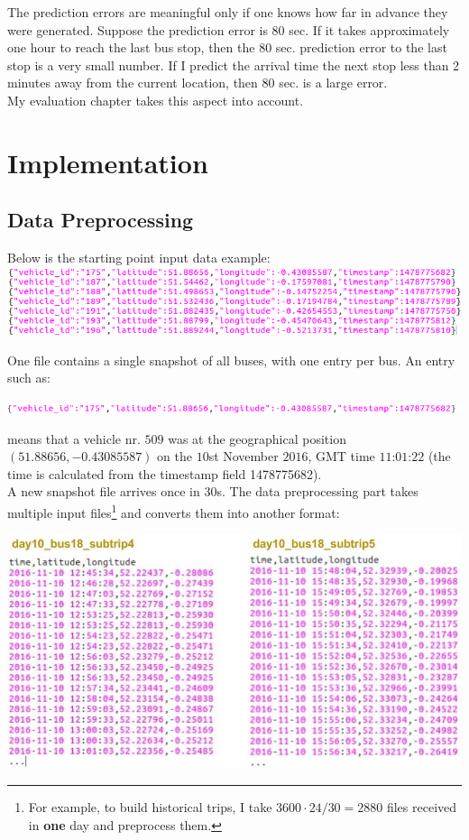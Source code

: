 \documentclass[12pt,a4paper,oneside,openright]{report}
\begin{document}
The prediction errors are meaningful only if one knows how far in advance they were
generated. Suppose the prediction error is 80 sec. If it takes approximately one hour to reach
the last bus stop, then the 80 sec. prediction error to the last stop is a very small number.
If I predict the arrival time the next stop less than 2 minutes away from the current location,
then 80 sec. is a large error. \\

My evaluation chapter takes this aspect into account.




\chapter{Implementation}

\section{Data Preprocessing}

Below is the starting point input data example: \\
\includegraphics[scale=0.6]{figs/starting_data.png}

One file contains a single snapshot of all buses, 
with one entry per bus. An entry such as:

\includegraphics[width=\textwidth]{figs/entry.png}

means that a vehicle nr. $509$ was at the geographical position
$(51.88656, -0.43085587)$ on the $10$st November $2016$, GMT time
$11$:$01$:$22$ (the time is calculated from the timestamp field 1478775682). \\

A new snapshot file arrives once in $30$s. The data preprocessing part
takes multiple input files\footnote{For example, to build historical trips, I take $3600 \cdot 24 / 30 = 2880$ files
received in \textbf{one} day and preprocess them.} and converts them into another format:

\includegraphics[width=\textwidth]{figs/converted_format.jpg}
\end{document}
